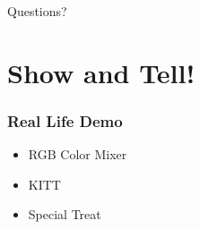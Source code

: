 \documentclass[yellow]{beamer}
\begin{document}
\begin{frame}
\begin{center}\huge{Questions?}\end{center}
\end{frame}

\section{Show and Tell!}
\begin{frame}
\frametitle{Real Life Demo}
\begin{center}
\begin{itemize}
	\item RGB Color Mixer
	\item KITT
	\item Special Treat
\end{itemize}
\end{center}
\end{frame}
\end{document}
